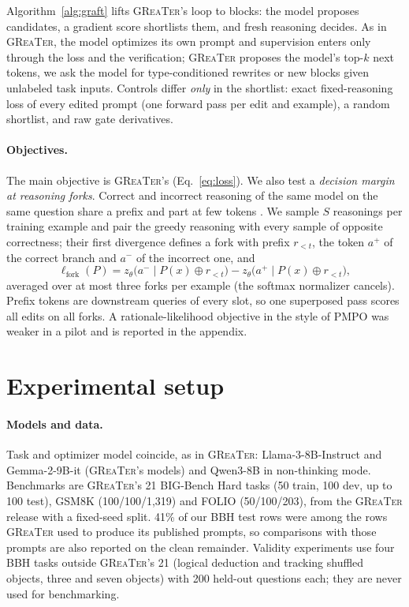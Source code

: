\documentclass{article}
\newcommand{\greater}{\textsc{GReaTer}}
\begin{document}
Algorithm~\ref{alg:graft} lifts \greater{}'s loop to blocks: the model proposes
candidates, a gradient score shortlists them, and fresh reasoning decides. As in
\greater{}, the model optimizes its own prompt and supervision enters only through the
loss and the verification; \greater{} proposes the model's top-$k$ next tokens, we ask
the model for type-conditioned rewrites or new blocks given unlabeled task inputs.
Controls differ \emph{only} in the shortlist: exact fixed-reasoning loss of every edited
prompt (one forward pass per edit and example), a random shortlist, and raw gate
derivatives.

\paragraph{Objectives.} The main objective is \greater{}'s (Eq.~\ref{eq:loss}). We also
test a \emph{decision margin at reasoning forks}. Correct and incorrect reasoning of
the same model on the same question share a prefix and part at few tokens
\citep{bigelow2025forking,lin2024critical,shen2026decision}. We sample $S$ reasonings per
training example and pair the greedy reasoning with every sample of opposite
correctness; their first divergence defines a fork with prefix $r_{<t}$, the token $a^+$
of the correct branch and $a^-$ of the incorrect one, and
\begin{equation}
\ell_{\text{fork}}(P)= z_\theta\big(a^-\mid P(x)\oplus r_{<t}\big)-z_\theta\big(a^+\mid P(x)\oplus r_{<t}\big),
\label{eq:fork}
\end{equation}
averaged over at most three forks per example (the softmax normalizer cancels). Prefix
tokens are downstream queries of every slot, so one superposed pass scores all edits on
all forks. A rationale-likelihood objective in the style of PMPO
\citep{zhao2025pmpo,zelikman2022star} was weaker in a pilot and is reported in the appendix.

\section{Experimental setup}
\label{sec:setup}

\paragraph{Models and data.} Task and optimizer model coincide, as in \greater{}:
Llama-3-8B-Instruct and Gemma-2-9B-it (\greater{}'s models) and Qwen3-8B in non-thinking
mode. Benchmarks are \greater{}'s 21 BIG-Bench Hard tasks \citep{suzgun2023bbh} (50
train, 100 dev, up to 100 test), GSM8K \citep{cobbe2021gsm8k} (100/100/1{,}319) and FOLIO
\citep{han2024folio} (50/100/203), from the \greater{} release with a fixed-seed split.
41\% of our BBH test rows were among the rows \greater{} used to produce its published
prompts, so comparisons with those prompts are also reported on the clean remainder.
Validity experiments use four BBH tasks outside \greater{}'s 21 (logical deduction and
tracking shuffled objects, three and seven objects) with 200 held-out questions each;
they are never used for benchmarking.
\end{document}
